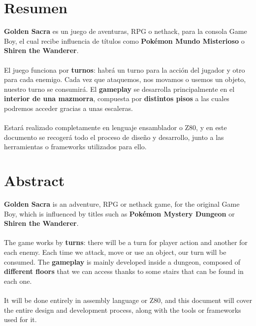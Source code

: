 
\chapter{Resumen}
\label{resumen}
\textbf{Golden Sacra} es un juego de aventuras, RPG o nethack, para la consola Game Boy, el cual recibe influencia de títulos como \textbf{Pokémon Mundo Misterioso} o \textbf{Shiren the Wanderer}. \\ \\
El juego funciona por \textbf{turnos}: habrá un turno para la acción del jugador y otro para cada enemigo. Cada vez que ataquemos, nos movamos o usemos un objeto, nuestro turno se consumirá. El \textbf{gameplay} se desarrolla principalmente en el \textbf{interior de una mazmorra}, compuesta por \textbf{distintos pisos} a las cuales podremos acceder gracias a unas escaleras. \\ \\
Estará realizado completamente en lenguaje ensamblador o Z80, y en este documento se recogerá todo el proceso de diseño y desarrollo, junto a las herramientas o frameworks utilizados para ello.
{\let\clearpage\relax\chapter*{Abstract}}

\textbf{Golden Sacra} is an adventure, RPG or nethack game, for the original Game Boy, which is influenced by titles such as \textbf{Pokémon Mystery Dungeon} or \textbf{Shiren the Wanderer}.
\\ \\
The game works by \textbf{turns}: there will be a turn for player action and another for each enemy. Each time we attack, move or use an object, our turn will be consumed. The \textbf{gameplay} is mainly developed inside a dungeon, composed of \textbf{different floors} that we can access thanks to some stairs that can be found in each one.
\\ \\
It will be done entirely in assembly language or Z80, and this document will cover the entire design and development process, along with the tools or frameworks used for it.
\cleardoublepage

